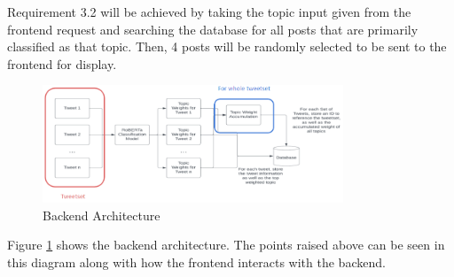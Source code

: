 Requirement 3.2 will be achieved by taking the topic input given from the frontend request and searching the database for all posts that
are primarily classified as that topic. Then, 4 posts will be randomly selected to be sent to the frontend for display.
\begin{figure}
    \centering
    \includegraphics[width=0.8\textwidth]{images/backend.png}
    \caption{Backend Architecture}
    \label{fig:backend}
\end{figure}
Figure \ref{fig:backend} shows the backend architecture. The points raised above can be seen in this diagram along with how the frontend
interacts with the backend.
